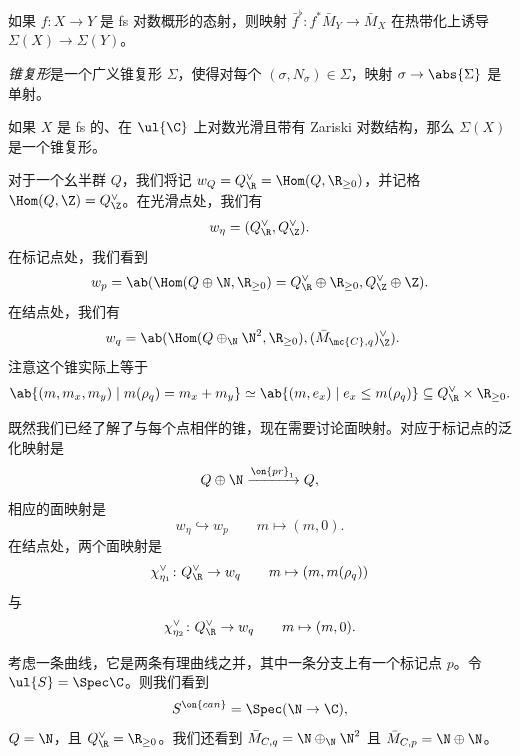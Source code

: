 \begin{exm}
    如果 \(f \colon X \to Y\) 是 fs 对数概形的态射，则映射 \(\bar{f}^{\flat} \colon f^* \bar{M}_Y \to \bar{M}_X\) 在热带化上诱导 \(\Sigma(X) \to \Sigma(Y)\)。
\end{exm}

\begin{defn}
    \textit{锥复形}是一个广义锥复形 \(\Sigma\)，使得对每个 \((\sigma, N_{\sigma}) \in \Sigma\)，映射 \(\sigma \to \abs{\Sigma}\) 是单射。
\end{defn}

\begin{thm}
    如果 \(X\) 是 fs 的、在 \(\ul{\C}\) 上对数光滑且带有 Zariski 对数结构，那么 \(\Sigma(X)\) 是一个锥复形。
\end{thm}

对于一个幺半群 \(Q\)，我们将记 \(w_Q = Q_{\R}^{\vee} = \Hom(Q, \R_{\geq 0})\)，并记格 \(\Hom(Q, \Z) = Q_{\Z}^{\vee}\)。在光滑点处，我们有
\[ w_{\eta} = (Q_{\R}^{\vee}, Q_{\Z}^{\vee}). \]
在标记点处，我们看到
\[ w_p = \ab(\Hom (Q \oplus \N, \R_{\geq 0}) = Q_{\R}^{\vee} \oplus \R_{\geq 0}, Q_{\Z}^{\vee}\oplus \Z). \]
在结点处，我们有
\begin{align*}
    w_q &= \ab(\Hom(Q \oplus_{\N} \N^2, \R_{\geq 0}), ( \bar{M}_{\mc{C}, q} )_{\Z}^{\vee}).
\end{align*}
注意这个锥实际上等于
\[ \ab\{(m, m_x, m_y) \mid m(\rho_q) = m_x + m_y \} \simeq \ab\{(m, e_x) \mid e_x \leq m(\rho_q) \} \subseteq Q_{\R}^{\vee} \times \R_{\geq 0}. \]

既然我们已经了解了与每个点相伴的锥，现在需要讨论面映射。对应于标记点的泛化映射是
\[ Q \oplus \N \xrightarrow{\on{pr}_1} Q, \]
相应的面映射是
\[ w_{\eta} \hookrightarrow w_p \qquad m \mapsto (m,0). \]
在结点处，两个面映射是
\[ \chi_{\eta_1}^{\vee} \colon Q_{\R}^{\vee} \to w_q \qquad m \mapsto (m, m(\rho_q)) \]
与
\[ \chi_{\eta_2}^{\vee} \colon Q_{\R}^{\vee} \to w_q \qquad m \mapsto (m, 0). \]

\begin{exm}
    考虑一条曲线，它是两条有理曲线之并，其中一条分支上有一个标记点 \(p\)。令 \(\ul{S} = \Spec \C\)。则我们看到
    \[ S^{\on{can}} = \Spec(\N \to \C), \]
    \(Q = \N\)，且 \(Q_{\R}^{\vee} = \R_{\geq 0}\)。我们还看到 \(\bar{M}_{C, q} = \N \oplus_{\N} \N^2\) 且 \(\bar{M}_{C, p} = \N \oplus \N\)。
\end{exm}

